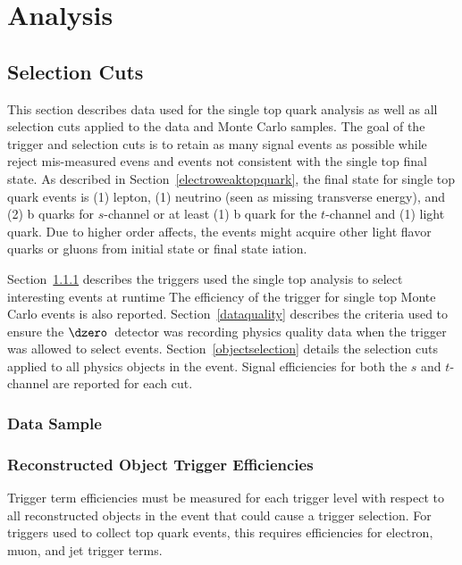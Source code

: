 \chapter{Analysis}

\section{Selection Cuts}
\label{selectioncuts}

This section describes data used for the single top quark analysis as well as all selection cuts applied to the data and Monte Carlo samples. The goal of the trigger and selection cuts is to retain as many signal events as possible while reject mis-measured evens and events not consistent with the single top final state. As described in Section~\ref{electroweaktopquark}, the final state for single top quark events is (1) lepton, (1) neutrino (seen as missing transverse energy), and (2) b quarks for $s$-channel or at least (1) b quark for the $t$-channel and (1) light quark. Due to higher order affects, the events might acquire other light flavor quarks or gluons from initial state or final state iation.

Section~\ref{datasample} describes the triggers used the single top analysis to select interesting events at runtime The efficiency of the trigger for single top Monte Carlo events is also reported. Section~\ref{dataquality} describes the criteria used to ensure the $\dzero$~detector was recording physics quality data when the trigger was allowed to select events. Section~\ref{objectselection} details the selection cuts applied to all physics objects in the event. Signal efficiencies for both the $s$ and $t$-channel are reported for each cut.

\subsection{Data Sample}
\label{datasample}

\subsection{Reconstructed Object Trigger Efficiencies}
\label{turnoncurves}

Trigger term efficiencies must be measured for each trigger level with respect to all reconstructed objects in the event that could cause a trigger selection. For triggers used to collect top quark events, this requires efficiencies for electron, muon, and jet trigger terms. 

